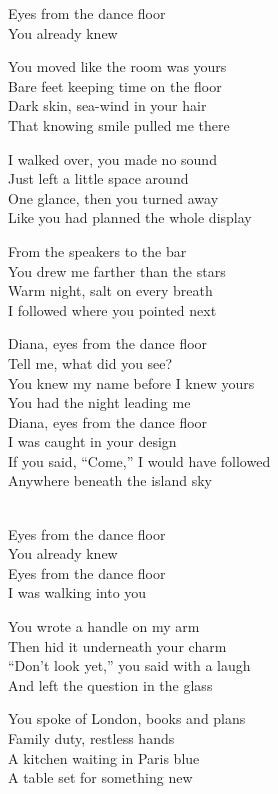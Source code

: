 \begin{lyrics}
Eyes from the dance floor\\
You already knew

You moved like the room was yours\\
Bare feet keeping time on the floor\\
Dark skin, sea-wind in your hair\\
That knowing smile pulled me there

I walked over, you made no sound\\
Just left a little space around\\
One glance, then you turned away\\
Like you had planned the whole display

From the speakers to the bar\\
You drew me farther than the stars\\
Warm night, salt on every breath\\
I followed where you pointed next

Diana, eyes from the dance floor\\
Tell me, what did you see?\\
You knew my name before I knew yours\\
You had the night leading me\\
Diana, eyes from the dance floor\\
I was caught in your design\\
If you said, “Come,” I would have followed\\
Anywhere beneath the island sky

\\
Eyes from the dance floor\\
You already knew\\
Eyes from the dance floor\\
I was walking into you

You wrote a handle on my arm\\
Then hid it underneath your charm\\
“Don’t look yet,” you said with a laugh\\
And left the question in the glass

You spoke of London, books and plans\\
Family duty, restless hands\\
A kitchen waiting in Paris blue\\
A table set for something new


\end{lyrics}
